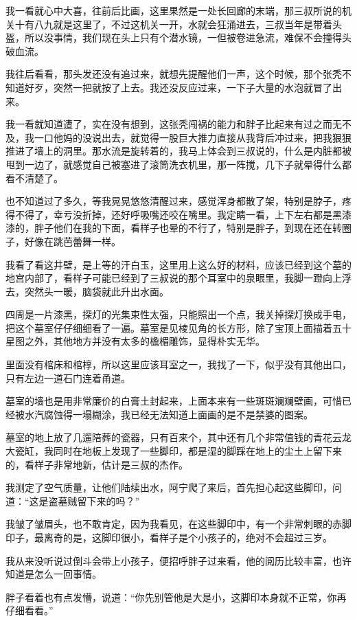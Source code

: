 我一看就心中大喜，往前后比画，这里果然是一处长回廊的末端，那三叔所说的机关十有八九就是这里了，不过这机关一开，水就会狂涌进去，三叔当年是带着头盔，所以没事情，我们现在头上只有个潜水镜，一但被卷进急流，难保不会撞得头破血流。

我往后看看，那头发还没有追过来，就想先提醒他们一声，这个时候，那个张秃不知道好歹，突然一把就按了上去。我还没反应过来，一下子大量的水泡就冒了出来。

我一看就知道遭了，实在没有想到，这张秃闯祸的能力和胖子比起来有过之而无不及，我一口他妈的没说出去，就觉得一股巨大推力直接从我背后冲过来，把我狠狠推进了墙上的洞里。那水流是旋转着的，我马上体会到三叔说的，什么是内脏都被甩到一边了，就感觉自己被塞进了滚筒洗衣机里，那一阵搅，几下子就晕得什么都看不清楚了。

也不知道过了多久，等我晃晃悠悠清醒过来，感觉浑身都散了架，特别是脖子，疼得不得了，幸亏没折掉，还好呼吸嘴还咬在嘴里。我定睛一看，上下左右都是黑漆漆的，胖子他们在我的下面，看样子也晕的不行了，特别是胖子，到现在还在转圈子，好像在跳芭蕾舞一样。

我看了看这井壁，是上等的汗白玉，这里用上这么好的材料，应该已经到这个墓的地宫内部了，看样子可能已经到了三叔说的那个耳室中的泉眼里，我脚一蹬向上浮去，突然头一暖，脑袋就此升出水面。

四周是一片漆黑，探灯的光集束性太强，只能照出一个点，我关掉探灯换成手电，把这个墓室仔仔细细看了一遍。墓室是见棱见角的长方形，除了宝顶上面描着五十星图之外，其他地方并没有太多的檐楣雕饰，显得朴实无华。

里面没有棺床和棺椁，所以这里应该耳室之一，我找了一下，似乎没有其他出口，只有左边一道石门连着甬道。

墓室的墙也是用非常廉价的白膏土封起来，上面本来有一些斑斑斓斓壁画，可惜已经被水汽腐蚀得一塌糊涂，我已经无法知道上面画的是不是禁婆的图案。

墓室的地上放了几遛陪葬的瓷器，只有百来个，其中还有几个非常值钱的青花云龙大瓷缸，我同时在地板上发现了一些脚印，都是湿的脚踩在地上的尘土上留下来的，看样子非常地新，估计是三叔的杰作。

我测定了空气质量，让他们陆续出水，阿宁爬了来后，首先担心起这些脚印，问道：“这是盗墓贼留下来的吗？”

我皱了皱眉头，也不敢肯定，因为我看见，在这些脚印中，有一个非常刺眼的赤脚印子，最离奇的是，这脚印很小，看样子是个小孩子的，绝对不会超过三岁。

我从来没听说过倒斗会带上小孩子，便招呼胖子过来看，他的阅历比较丰富，也许知道是怎么一回事情。

胖子看着也有点发懵，说道：“你先别管他是大是小，这脚印本身就不正常，你再仔细看看。”

